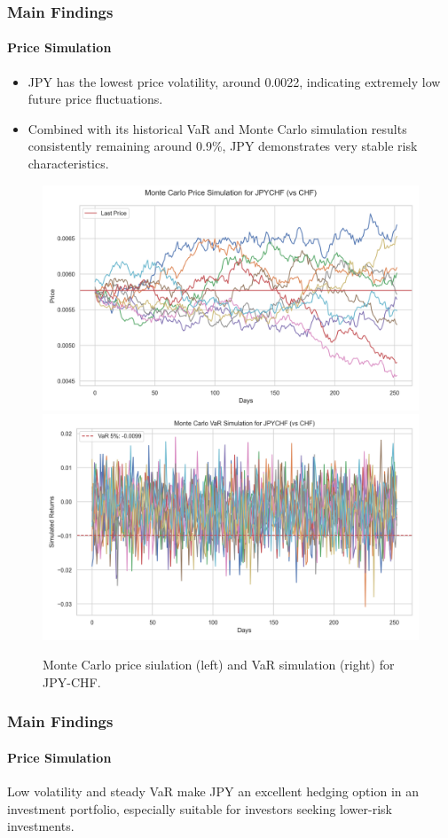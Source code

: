 \documentclass[10pt]{beamer}
\begin{document}
\begin{frame}
\frametitle{Main Findings}
\framesubtitle{Price Simulation}
\begin{itemize}
    \item JPY has the lowest price volatility, around 0.0022, indicating extremely low future price fluctuations. 
    \item Combined with its historical VaR and Monte Carlo simulation results consistently remaining around 0.9\%, JPY demonstrates very stable risk characteristics. 
\end{itemize}
\begin{figure}
    \centering  \includegraphics[width=0.48\linewidth]{reports/figures/monte_carlo_price_simulation_JPYCHF_vs_CHF.png}  \label{fig:monte_carlo_price_simulation_JPYCHF_vs_CHF}
    \includegraphics[width=0.48\linewidth]{reports/figures/monte_carlo_var_simulation_JPYCHF_vs_CHF.png}  \label{fig:monte_carlo_var_simulation_JPYCHF_vs_CHF}
    \caption{\footnotesize Monte Carlo price siulation (left) and VaR simulation (right) for JPY-CHF.}
\end{figure}
\end{frame}
\begin{frame}
\frametitle{Main Findings}
\framesubtitle{Price Simulation}
Low volatility and steady VaR make JPY an excellent hedging option in an investment portfolio, especially suitable for investors seeking lower-risk investments.
\end{frame}
\end{document}
